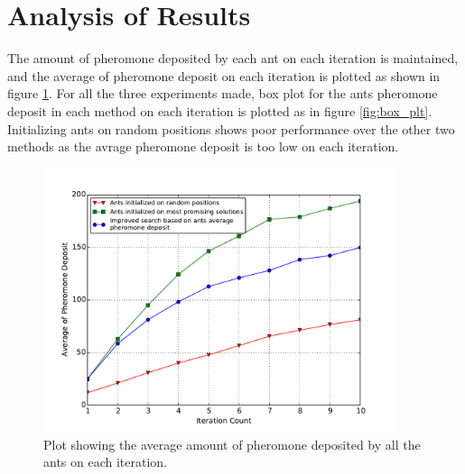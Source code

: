 \documentclass{llncs}
\begin{document}
	
	\section{Analysis of Results}\label{sec:comparision}
	The amount of pheromone deposited by each ant on each iteration is maintained, and the average of pheromone deposit on each iteration is plotted as shown in figure \ref{fig:avg_plot}. For all the three experiments made, box plot for the ants pheromone deposit in each method on each iteration is plotted as in figure \ref{fig:box_plt}. Initializing ants on random positions shows poor performance over the other two methods as the avrage pheromone deposit is too low on each iteration.
	
	\begin{figure}[H]
		\centering
		\includegraphics[width=0.92\textwidth]{PLT/Comparision/average}
		\caption{Plot showing the average amount of pheromone deposited by all the ants on each iteration.}
		\label{fig:avg_plot}
	\end{figure}
	
\end{document}
